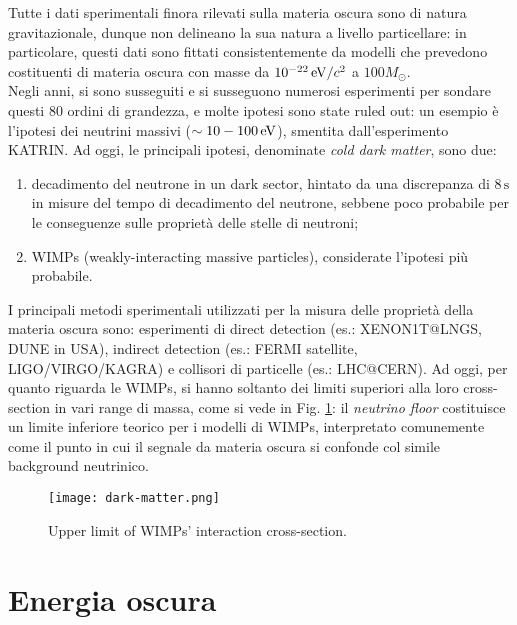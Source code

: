 Tutte i dati sperimentali finora rilevati sulla materia oscura sono di natura gravitazionale, dunque non delineano la sua natura a livello particellare: in particolare, questi dati sono fittati consistentemente da modelli che prevedono costituenti di materia oscura con masse da $ 10^{-22} \,\mathrm{eV}/c^2 $ a $ 100 M_\odot $.\\
Negli anni, si sono susseguiti e si susseguono numerosi esperimenti per sondare questi 80 ordini di grandezza, e molte ipotesi sono state ruled out: un esempio è l'ipotesi dei neutrini massivi ($ \sim 10-100 \,\mathrm{eV} $), smentita dall'esperimento KATRIN. Ad oggi, le principali ipotesi, denominate \textit{cold dark matter}, sono due:
\begin{enumerate}
	\item decadimento del neutrone in un dark sector, hintato da una discrepanza di $ 8\,\text{s} $ in misure del tempo di decadimento del neutrone, sebbene poco probabile per le conseguenze sulle proprietà delle stelle di neutroni;
	\item WIMPs (weakly-interacting massive particles), considerate l'ipotesi più probabile.
\end{enumerate}
I principali metodi sperimentali utilizzati per la misura delle proprietà della materia oscura sono: esperimenti di direct detection (es.: XENON1T@LNGS, DUNE in USA), indirect detection (es.: FERMI satellite, LIGO/VIRGO/KAGRA) e collisori di particelle (es.: LHC@CERN). Ad oggi, per quanto riguarda le WIMPs, si hanno soltanto dei limiti superiori alla loro cross-section in vari range di massa, come si vede in Fig. \ref{dark-matter}: il \textit{neutrino floor} costituisce un limite inferiore teorico per i modelli di WIMPs, interpretato comunemente come il punto in cui il segnale da materia oscura si confonde col simile background neutrinico.

\begin{figure}
	\centering
	\texttt{[image: dark-matter.png]}
	\caption{Upper limit of WIMPs' interaction cross-section.}
	\label{dark-matter}
\end{figure}

\section{Energia oscura}

